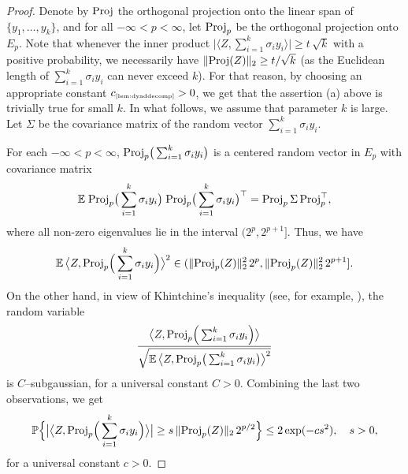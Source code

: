 \documentclass[11pt]{amsart}
\theoremstyle{definition}
\theoremstyle{plain}
\def\Prob{{\mathbb P}}
\def\Prob{{\mathbb P}}
\def\Exp{{\mathbb E}}
\def\Proj{{\rm Proj}}
\begin{document}
\begin{proof}
Denote by $\Proj$ the orthogonal projection
onto the linear span of $\{y_1,\dots,y_k\}$, and
for all $-\infty< p< \infty$, let $\Proj_p$
be the orthogonal projection onto $E_p$.
Note that whenever the inner product $\big|\big\langle Z,\sum_{i=1}^k \sigma_i y_i\big\rangle\big|
\geq t\,\sqrt{k}$ with a positive probability,
we necessarily have $\|\Proj(Z)\|_2\geq t/\sqrt{k}$ (as the Euclidean length
of $\sum_{i=1}^k \sigma_i y_i$ can never exceed $k$).
For that reason, by choosing an appropriate constant 
$c_{\text{\tiny{\ref{lem:dyaddecomp}}}}>0$, we get that the assertion (a)
above is trivially true for small $k$.
In what follows, we assume that parameter $k$ is large.
Let $\Sigma$ be the covariance matrix of the random vector
$\sum_{i=1}^k \sigma_i y_i$.

For each $-\infty<p<\infty$, $\Proj_p\big(\sum_{i=1}^k \sigma_i y_i\big)$
is a centered random vector in $E_p$
with covariance matrix
$$
\Exp\;\Proj_p\big(\sum_{i=1}^k \sigma_i y_i\big)\;\Proj_p\big(\sum_{i=1}^k \sigma_i y_i\big)^\top
=\Proj_p\,\Sigma\, \Proj_p^\top,
$$
where all non-zero eigenvalues lie in the interval $(2^p,2^{p+1}]$.
Thus, we have
$$
\Exp\,\big\langle Z,\Proj_p\Big(\sum_{i=1}^k \sigma_i y_i\Big)\big\rangle^2
\in (\|\Proj_p(Z)\|_2^2\,2^p,\|\Proj_p(Z)\|_2^2\,2^{p+1}].
$$
On the other hand, in view of Khintchine's inequality (see,
for example, \cite[Section~2.6]{Ver18}),
the random variable
$$
\frac{\big\langle Z,\Proj_p\Big(\sum_{i=1}^k \sigma_i y_i\Big)\big\rangle}
{\sqrt{\Exp\,\big\langle Z,\Proj_p\big(\sum_{i=1}^k \sigma_i y_i\big)\big\rangle^2}}
$$
is $C$--subgaussian, for a universal constant $C>0$.
Combining the last two observations, we get
\begin{equation}\label{aksjnfakfjnsk}
\Prob\Big\{\big|\big\langle Z,\Proj_p
\Big(\sum_{i=1}^k \sigma_i y_i\Big)\big\rangle\big|\geq s\,
\|\Proj_p(Z)\|_2\,2^{p/2}\Big\}
\leq 2\exp(-cs^2),\quad s>0,
\end{equation}
for a universal constant $c>0$.


\end{proof}
\end{document}
